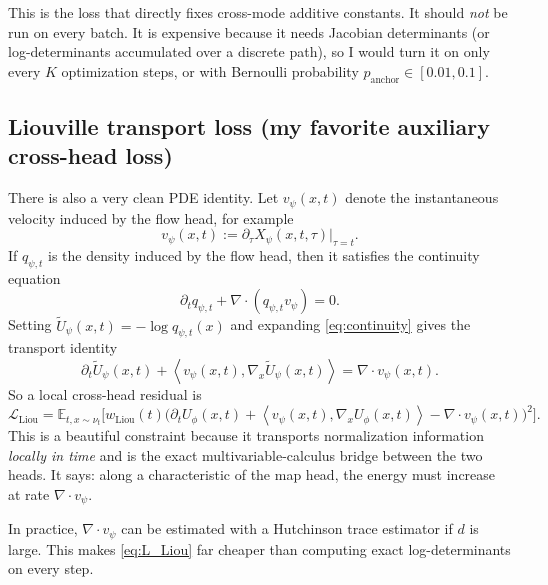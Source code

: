 \documentclass[11pt]{article}
\newcommand{\E}{\mathbb{E}}
\newcommand{\divergence}{\nabla\!\cdot\!}
\newcommand{\inner}[2]{\left\langle #1, #2 \right\rangle}
\newcommand{\grad}{\nabla}
\newcommand{\flow}{X_{\psi}}
\newcommand{\energy}{U_{\phi}}
\begin{document}
This is the loss that directly fixes cross-mode additive constants. It should \emph{not} be run on every batch. It is expensive because it needs Jacobian determinants (or log-determinants accumulated over a discrete path), so I would turn it on only every $K$ optimization steps, or with Bernoulli probability $p_{\mathrm{anchor}} \in [0.01,0.1]$.

\subsection{Liouville transport loss (my favorite auxiliary cross-head loss)}

There is also a very clean PDE identity. Let $v_{\psi}(x,t)$ denote the instantaneous velocity induced by the flow head, for example
\begin{equation}
 v_{\psi}(x,t) := \partial_{\tau}\flow(x,t,\tau)\big|_{\tau=t}.
\label{eq:velocity_from_map}
\end{equation}
If $q_{\psi,t}$ is the density induced by the flow head, then it satisfies the continuity equation
\begin{equation}
\partial_t q_{\psi,t} + \divergence(q_{\psi,t} v_{\psi}) = 0.
\label{eq:continuity}
\end{equation}
Setting $\widetilde U_{\psi}(x,t) = -\log q_{\psi,t}(x)$ and expanding \eqref{eq:continuity} gives the transport identity
\begin{equation}
\partial_t \widetilde U_{\psi}(x,t)
+
\inner{v_{\psi}(x,t)}{\grad_x \widetilde U_{\psi}(x,t)}
=
\divergence v_{\psi}(x,t).
\label{eq:liouville_teacher}
\end{equation}
So a local cross-head residual is
\begin{equation}
\mathcal{L}_{\mathrm{Liou}}
=
\E_{t,x \sim \nu_t}
\Big[
 w_{\mathrm{Liou}}(t)
\big(
\partial_t \energy(x,t)
+
\inner{v_{\psi}(x,t)}{\grad_x \energy(x,t)}
-
\divergence v_{\psi}(x,t)
\big)^2
\Big].
\label{eq:L_Liou}
\end{equation}
This is a beautiful constraint because it transports normalization information \emph{locally in time} and is the exact multivariable-calculus bridge between the two heads. It says: along a characteristic of the map head, the energy must increase at rate $\divergence v_{\psi}$.

In practice, $\divergence v_{\psi}$ can be estimated with a Hutchinson trace estimator if $d$ is large. This makes \eqref{eq:L_Liou} far cheaper than computing exact log-determinants on every step.
\end{document}
